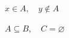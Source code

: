 \documentclass{article}
\begin{document}
$x\in A,\quad y\notin A$

$A\subseteq B,\quad C=\varnothing$
\end{document}
